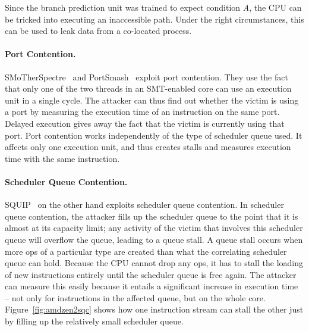 \documentclass[11pt,
  titlepage=false,
]{scrreprt}
\begin{document}
Since the branch prediction unit was trained to expect condition \textit{A},
the CPU can be tricked into executing an inaccessible path.
Under the right circumstances, this can be used to leak data from a co-located process.

\paragraph{Port Contention.}
SMoTherSpectre~\cite{Bhattacharyya2019} and PortSmash~\cite{Aldaya2019port} exploit port contention.
They use the fact that only one of the two threads in an SMT-enabled core can use an execution unit in a single cycle.
The attacker can thus find out whether the victim is using a port by measuring the execution time of an instruction on the same port.
Delayed execution gives away the fact that the victim is currently using that port.
Port contention works independently of the type of scheduler queue used.
It affects only one execution unit, and thus creates stalls and measures execution time with the same instruction.

\paragraph{Scheduler Queue Contention.}
SQUIP~\cite{squip} on the other hand exploits scheduler queue contention.
In scheduler queue contention, the attacker fills up the scheduler queue to the point that it is almost at its capacity limit;
any activity of the victim that involves this scheduler queue will overflow the queue, leading to a queue stall.
A queue stall occurs when more \textmu ops of a particular type are created than what the correlating scheduler queue can hold.
Because the CPU cannot drop any \textmu ops, it has to stall the loading of new instructions entirely until the scheduler queue is free again.
The attacker can measure this easily because it entails a significant increase in execution time --
not only for instructions in the affected queue, but on the whole core.
Figure~\ref{fig:amdzen2sqc} shows how one instruction stream can stall the other just by filling up the relatively small scheduler queue.
\end{document}
